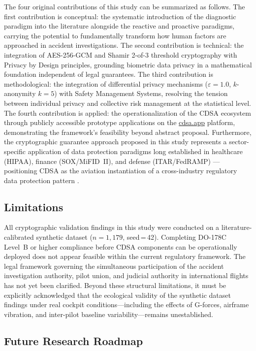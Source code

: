 \documentclass[12pt,a4paper]{article}
\begin{document}
The four original contributions of this study can be summarized as follows. The first contribution
is conceptual: the systematic introduction of the diagnostic paradigm into the literature alongside
the reactive and proactive paradigms, carrying the potential to fundamentally transform how human
factors are approached in accident investigations. The second contribution is technical: the
integration of AES-256-GCM and Shamir 2-of-3 threshold cryptography with Privacy by Design
principles, grounding biometric data privacy in a mathematical foundation independent of legal
guarantees. The third contribution is methodological: the integration of differential privacy
mechanisms ($\varepsilon=1.0$, $k$-anonymity $k=5$) with Safety Management Systems, resolving
the tension between individual privacy and collective risk management at the statistical level.
The fourth contribution is applied: the operationalization of the CDSA ecosystem through publicly
accessible prototype applications on the \href{https://cdsa.app}{cdsa.app} platform, demonstrating
the framework's feasibility beyond abstract proposal. Furthermore, the cryptographic guarantee
approach proposed in this study represents a sector-specific application of data protection
paradigms long established in healthcare (HIPAA), finance (SOX/MiFID~II), and defense
(ITAR/FedRAMP) --- positioning CDSA as the aviation instantiation of a cross-industry regulatory
data protection pattern \citep{conduah2025,mcnulty2023,nitrd2022}.

\subsection{Limitations}

All cryptographic validation findings in this study were conducted on a literature-calibrated
synthetic dataset ($n=1{,}179$, seed\,=\,42). Completing DO-178C Level~B or higher compliance
before CDSA components can be operationally deployed does not appear feasible within the current
regulatory framework. The legal framework governing the simultaneous participation of the accident
investigation authority, pilot union, and judicial authority in international flights has not yet
been clarified. Beyond these structural limitations, it must be explicitly acknowledged that the
ecological validity of the synthetic dataset findings under real cockpit conditions---including
the effects of G-forces, airframe vibration, and inter-pilot baseline variability---remains
unestablished.

\subsection{Future Research Roadmap}
\label{sec:63}
\end{document}
